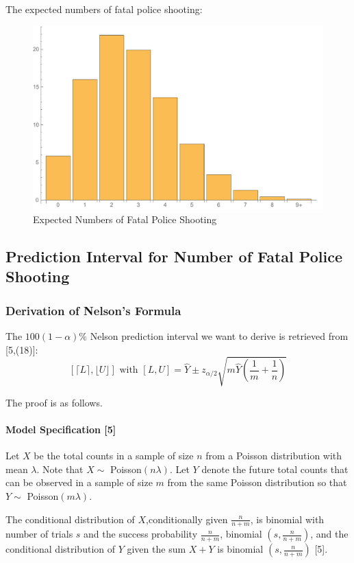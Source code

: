 \documentclass[a4paper]{article}
\begin{document}
The expected numbers of fatal police shooting:
\begin{figure}[!htbp]
\centering
\includegraphics[width=0.8\linewidth]{expectedbar2.pdf}
\caption{Expected Numbers of Fatal Police Shooting}
\end{figure}

\newpage

\subsection{Prediction Interval for Number of Fatal Police Shooting}
\subsubsection{Derivation of Nelson's Formula}
The $100(1-\alpha)\%$ Nelson prediction interval we want to derive is retrieved from [5,(18)]:
$$[\lceil L \rceil,\lfloor U \rfloor] \text{ with } [L,U]=\widehat{Y}\pm z_{\alpha/2}\sqrt{m\widehat{Y}(\frac{1}{m}+\frac{1}{n})}$$

The proof is as follows.

\paragraph{Model Specification [5]}
Let $X$ be the total counts in a sample of size $n$ from a Poisson distribution with mean $\lambda$. Note that $X\sim$ Poisson$(n\lambda)$. Let $Y$ denote the future total counts that can be observed in a sample of size $m$ from the same Poisson distribution so that $Y\sim$ Poisson$(m\lambda)$. 

The conditional distribution of $X$,conditionally given $\displaystyle\frac{n}{n+m}$, is binomial with number of trials $s$ and the success probability $\displaystyle\frac{n}{n+m}$, binomial $(s,\displaystyle\frac{n}{n+m})$, and the conditional distribution of $Y$ given the sum $X+Y$ is binomial $(s,\displaystyle\frac{n}{n+m})$ [5].
\end{document}
